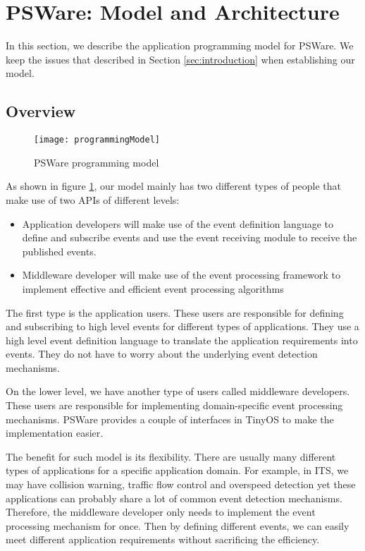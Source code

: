 \section{PSWare: Model and Architecture}
\label{sec:model}
In this section, we describe the application programming model for PSWare. We keep the issues that described in Section \ref{sec:introduction} when establishing our model.

\subsection{Overview}
\begin{figure}
\centering
\texttt{[image: programmingModel]}
\caption{PSWare programming model}
\label{fig:programmingModel}
\end{figure}

As shown in figure \ref{fig:programmingModel}, our model mainly has two different types of people that make use of two APIs of different levels:
\begin{itemize}
\item Application developers will make use of the event definition language to define and subscribe events and use the event receiving module to receive the published events.
\item Middleware developer will make use of the event processing framework to implement effective and efficient event processing algorithms
\end{itemize}

The first type is the application users. These users are responsible for defining and subscribing to high level events for different types of applications. They use a high level event definition language to translate the application requirements into events. They do not have to worry about the underlying event detection mechanisms.

On the lower level, we have another type of users called middleware developers. These users are responsible for implementing domain-specific event processing mechanisms. PSWare provides a couple of interfaces in TinyOS to make the implementation easier.

The benefit for such model is its flexibility. There are usually many different types of applications for a specific application domain. For example, in ITS, we may have collision warning, traffic flow control and overspeed detection yet these applications can probably share a lot of common event detection mechanisms. Therefore, the middleware developer only needs to implement the event processing mechanism for once. Then by defining different events, we can easily meet different application requirements without sacrificing the efficiency.

